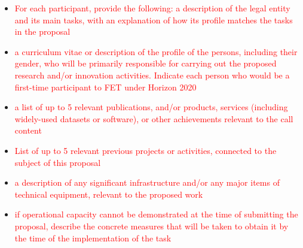 \documentclass[11pt, a4paper]{article} %
\begin{document}
 \begin{itemize}
 \item \textcolor{red}{For each participant, provide the following: a
     description of the legal entity and its main tasks, with an
     explanation of how its profile matches the tasks in the proposal}
 \item \textcolor{red}{a curriculum vitae or description of the
     profile of the persons, including their gender, who will be
     primarily responsible for carrying out the proposed research
     and/or innovation activities. Indicate each person who would be a
     first-time participant to FET under Horizon 2020}
\item \textcolor{red}{a list of up to 5 relevant publications, and/or
    products, services (including widely-used datasets or software),
    or other achievements relevant to the call content}
\item \textcolor{red}{List of up to 5 relevant previous projects or
    activities, connected to the subject of this proposal}
 \item \textcolor{red}{a description of any significant infrastructure
     and/or any major items of technical equipment, relevant to the
     proposed work}
 \item \textcolor{red}{if operational capacity cannot be demonstrated
     at the time of submitting the proposal, describe the concrete
     measures that will be taken to obtain it by the time of the
     implementation of the task}
 \end{itemize}
\end{document}
